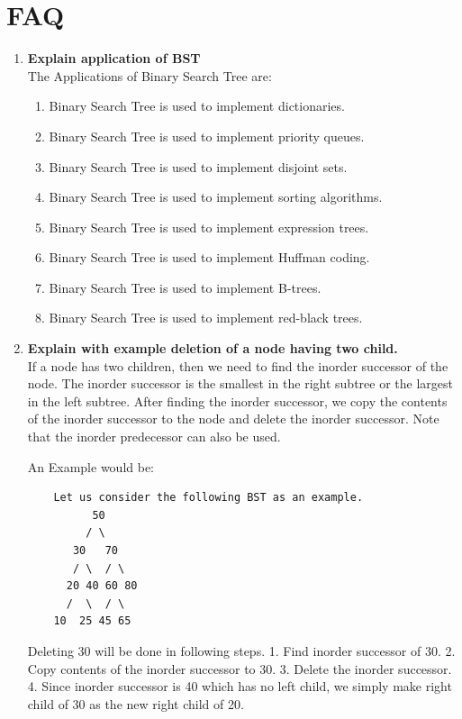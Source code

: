 \documentclass[11pt]{article}
\begin{document}
\section{FAQ}
\begin{enumerate}
    \item \textbf{Explain application of BST}\\

          The Applications of Binary Search Tree are:
          \begin{enumerate}
              \item Binary Search Tree is used to implement dictionaries.
              \item Binary Search Tree is used to implement priority queues.
              \item Binary Search Tree is used to implement disjoint sets.
              \item Binary Search Tree is used to implement sorting algorithms.
              \item Binary Search Tree is used to implement expression trees.
              \item Binary Search Tree is used to implement Huffman coding.
              \item Binary Search Tree is used to implement B-trees.
              \item Binary Search Tree is used to implement red-black trees.
          \end{enumerate}
    \item \textbf{Explain with example deletion of a node having two child.}\\

          If a node has two children, then we need to find the inorder successor of the node. The inorder successor is the smallest in the right subtree or the largest in the left subtree. After finding the inorder successor, we copy the contents of the inorder successor to the node and delete the inorder successor. Note that the inorder predecessor can also be used.

          An Example would be:
          \begin{verbatim}
    Let us consider the following BST as an example.
          50
         / \
       30   70
       / \  / \
      20 40 60 80
      /  \  / \
    10  25 45 65
\end{verbatim}

          Deleting 30 will be done in following steps.
          1. Find inorder successor of 30.
          2. Copy contents of the inorder successor to 30.
          3. Delete the inorder successor.
          4. Since inorder successor is 40 which has no left child, we simply make right child of 30 as the new right child of 20.


\end{enumerate}
\end{document}
